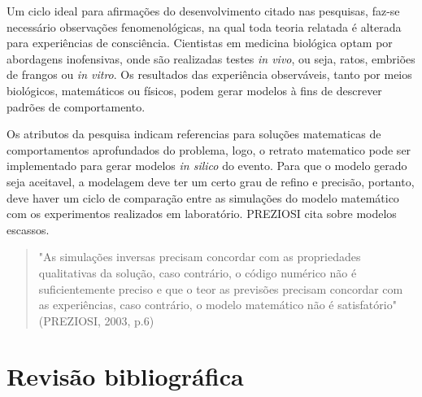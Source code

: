 \documentclass[12pt]{article}
\begin{document}

Um ciclo ideal para afirmações do desenvolvimento citado nas pesquisas, faz-se necessário observações fenomenológicas, na qual toda teoria relatada é alterada para experiências de consciência. Cientistas em medicina biológica optam por abordagens inofensivas, onde são realizadas testes \emph{in vivo}, ou seja, ratos, embriões de frangos ou \emph{in vitro}. Os resultados das experiência observáveis, tanto por meios biológicos, matemáticos ou físicos, podem gerar modelos à fins de descrever padrões de comportamento. 

Os atributos da pesquisa indicam referencias para soluções matematicas de comportamentos aprofundados do problema, logo, o retrato matematico pode ser implementado para gerar modelos \emph{in silico} do evento. Para que o modelo gerado seja aceitavel, a modelagem deve ter um certo grau de refino e precisão, portanto, deve haver um ciclo de comparação entre as simulações do modelo matemático com os experimentos realizados em laboratório. PREZIOSI cita sobre modelos escassos. \begin{quotation}
"As simulações inversas precisam concordar com as propriedades qualitativas da solução, caso contrário, o código numérico não é suficientemente preciso e que o teor as previsões precisam concordar com as experiências, caso contrário, o modelo matemático não é satisfatório" (PREZIOSI, 2003, p.6)
\end{quotation}





\section{Revisão bibliográfica} %

\end{document}
